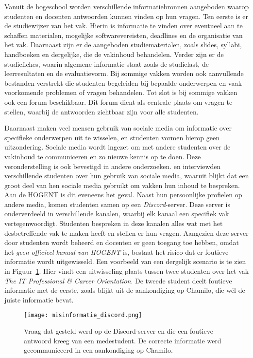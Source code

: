 Vanuit de hogeschool worden verschillende informatiebronnen aangeboden waarop studenten en docenten antwoorden kunnen vinden op hun vragen. Ten eerste is er de studiewijzer van het vak. Hierin is informatie te vinden over eventueel aan te schaffen materialen, mogelijke softwarevereisten, deadlines en de organisatie van het vak. Daarnaast zijn er de aangeboden studiematerialen, zoals slides, syllabi, handboeken en dergelijke, die de vakinhoud behandelen. Verder zijn er de studiefiches, waarin algemene informatie staat zoals de studielast, de leerresultaten en de evaluatievorm. Bij sommige vakken worden ook aanvullende bestanden verstrekt die studenten begeleiden bij bepaalde onderwerpen en vaak voorkomende problemen of vragen behandelen. Tot slot is bij sommige vakken ook een forum beschikbaar. Dit forum dient als centrale plaats om vragen te stellen, waarbij de antwoorden zichtbaar zijn voor alle studenten.

Daarnaast maken veel mensen gebruik van sociale media om informatie over specifieke onderwerpen uit te wisselen, en studenten vormen hierop geen uitzondering. Sociale media wordt ingezet om met andere studenten over de vakinhoud te communiceren en zo nieuwe kennis op te doen. Deze veronderstelling is ook bevestigd in andere onderzoeken. \textcite{M.Talaue2018} en \textcite{Bal2017} interviewden verschillende studenten over hun gebruik van sociale media, waaruit blijkt dat een groot deel van hen sociale media gebruikt om vakken hun inhoud te bespreken. Aan de HOGENT is dit eveneens het geval. Naast hun persoonlijke profielen op andere media, komen studenten samen op een \emph{Discord}-server. Deze server is onderverdeeld in verschillende kanalen, waarbij elk kanaal een specifiek vak vertegenwoordigt. Studenten bespreken in deze kanalen alles wat met het desbetreffende vak te maken heeft en stellen er hun vragen. Aangezien deze server door studenten wordt beheerd en docenten er geen toegang toe hebben, omdat het \emph{geen officieel kanaal van HOGENT} is, bestaat het risico dat er foutieve informatie wordt uitgewisseld. Een voorbeeld van een dergelijk scenario is te zien in Figuur~\ref{fig:misinformatie_discord}. Hier vindt een uitwisseling plaats tussen twee studenten over het vak \emph{The IT Professional \& Career Orientation}. De tweede student deelt foutieve informatie met de eerste, zoals blijkt uit de aankondiging op Chamilo, die wél de juiste informatie bevat.

\begin{figure}
    \centering
    \texttt{[image: misinformatie\_discord.png]}
    \caption[Misinformatie op Discord-server]{\label{fig:misinformatie_discord}Vraag dat gesteld werd op de Discord-server en die een foutieve antwoord kreeg van een medestudent. De correcte informatie werd gecommuniceerd in een aankondiging op Chamilo.}
\end{figure}

